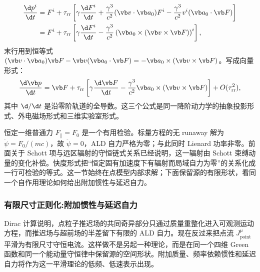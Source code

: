 \begin{align*}
 {\d p^i\over\d t}
 &=F^i+\tau_{\mathrm{rr}}\left[\gamma{\d F^i\over\d t}
 +{\gamma^3\over c^2}(\vb v\cdot\vb a_0)F^i
 -{\gamma^3\over c^2}v^i(\vb a_0\cdot\vb F)\right]\\
 &=F^i+\tau_{\mathrm{rr}}\left[\gamma{\d F^i\over\d t}
 -{\gamma^3\over c^2}\left(\vb a_0\times(\vb v\times\vb F)\right)^i\right],
\end{align*}
末行用到恒等式 $(\vb v\cdot\vb a_0)\vb F-\vb v(\vb a_0\cdot\vb F)=-\vb a_0\times(\vb v\times\vb F)$。写成向量形式：
\begin{equation*}
 {\d\vb p\over\d t}
 =\vb F
 +\tau_{\mathrm{rr}}
 \left[
 \gamma{\d\vb F\over\d t}
 -{\gamma^3\over c^2}
 \vb a_0\times(\vb v\times\vb F)
 \right]
 +O(\tau_{\mathrm{rr}}^2),
\end{equation*}
其中 $\d/\d t$ 是沿零阶轨道的全导数。这三个公式是同一降阶动力学的抽象投影形式、外电磁场形式和三维实验室形式。

恒定一维普通力 $F_\parallel=F_0$ 是一个有用检验。标量方程的无 runaway 解为 $\dot\psi=F_0/(mc)$，故 $\ddot\psi=0$，ALD 自力严格为零；与此同时 Lienard 功率非零。前面关于 Schott 项与远区辐射的守恒链式关系已经说明，这一辐射由 Schott 束缚动量的变化补偿。快度形式把“恒定固有加速度下有辐射而局域自力为零”的关系化成一行可检验的等式。这一节始终在点模型内部求解；下面保留源的有限形状，看同一个自作用理论如何给出附加惯性与延迟自力。

\subsubsection{有限尺寸正则化:附加惯性与延迟自力}

Dirac 计算说明，点粒子推迟场的共同奇异部分只通过质量重整化进入可观测运动方程，而推迟场与超前场的半差留下有限的 ALD 自力。现在反过来把点流 $J^\mu_{\mathrm{point}}$ 平滑为有限尺寸守恒电流。这样做不是另起一种理论，而是在同一个四维 Green 函数和同一个能动量守恒律中保留源的空间形状。附加质量、频率依赖惯性和延迟自力将作为这一平滑理论的低频、低速表示出现。

